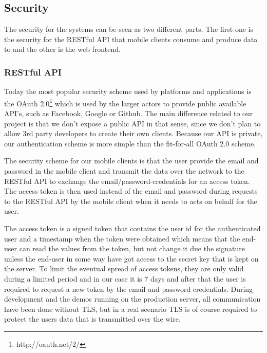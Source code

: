 \subsection{Security}
The security for the systems can be seen as two different parts. The first one is the security for the RESTful API that mobile clients consume and produce data to and the other is the web frontend.

\subsubsection{RESTful API}
Today the most popular security scheme used by platforms and applications is the OAuth 2.0\footnote{http://oauth.net/2/} which is used by the larger actors to provide public available API's, such as Facebook, Google or Github. The main difference related to our project is that we don't expose a public API in that sense, since we don't plan to allow 3rd party developers to create their own clients. Because our API is private, our authentication scheme is more simple than the fit-for-all OAuth 2.0 scheme. 

The security scheme for our mobile clients is that the user provide the email and password in the mobile client and transmit the data over the network to the RESTful API to exchange the email/password-credentials for an access token. The access token is then used instead of the email and password during requests to the RESTful API by the mobile client when it needs to acts on behalf for the user. 

The access token is a signed token that contains the user id for the authenticated user and a timestamp when the token were obtained which means that the end-user can read the values from the token, but not change it due the signature unless the end-user in some way have got access to the secret key that is kept on the server. To limit the eventual spread of access tokens, they are only valid during a limited period and in our case it is 7 days and after that the user is required to request a new token by the email and password credentials. During development and the demos running on the production server, all communication have been done without TLS, but in a real scenario TLS is of course required to protect the users data that is transmitted over the wire.
